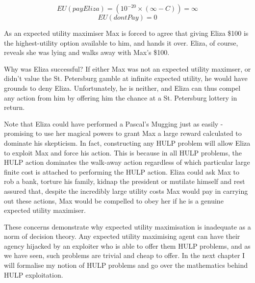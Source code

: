 \documentclass{article}
\begin{document}
\[EU(payEliza)=(10^{-20}\times(\infty-C)) = \infty\]
\[EU(dontPay)=0\]

As an expected utility maximiser Max is forced to agree that giving Eliza \$100 is the highest-utility option available to him, and hands it over. Eliza, of course, reveals she was lying and walks away with Max's \$100.

Why was Eliza successful? If either Max was not an expected utility maximser, or didn't value the St. Petersburg gamble at infinite expected utility, he would have grounds to deny Eliza. Unfortunately, he is neither, and Eliza can thus compel any action from him by offering him the chance at a St. Petersburg lottery in return. 

Note that Eliza could have performed a Pascal's Mugging just as easily - promising to use her magical powers to grant Max a large reward calculated to dominate his skepticism. In fact, constructing any HULP problem will allow Eliza to exploit Max and force his action. This is because in all HULP problems, the HULP action dominates the walk-away action regardless of which particular large finite cost is attached to performing the HULP action. Eliza could ask Max to rob a bank, torture his family, kidnap the president or mutilate himself and rest assured that, despite the incredibly large utility costs Max would pay in carrying out these actions, Max would be compelled to obey her if he is a genuine expected utility maximiser.

These concerns demonstrate why expected utility maximisation is inadequate as a norm of decision theory. Any expected utility maximising agent can have their agency hijacked by an exploiter who is able to offer them HULP problems, and as we have seen, such problems are trivial and cheap to offer. In the next chapter I will formalise my notion of HULP problems and go over the mathematics behind HULP exploitation.
\end{document}
